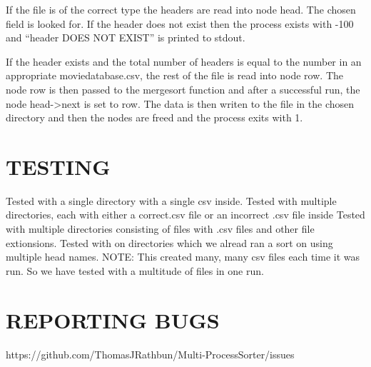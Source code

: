 \documentclass{article}
\begin{document}
\begin{center}
If the file is of the correct type the headers are read into node head. The chosen field is looked for. If the header does not exist then the process exists with -100 and ``header DOES NOT EXIST'' is printed to stdout.

If the header exists and the total number of headers is equal to the number in an appropriate moviedatabase.csv, the rest of the file is read into node row. The node row is then passed to the mergesort function and after a successful run, the node head->next is set to row. The data is then writen to the file in the chosen directory and then the nodes are freed and the process exits with 1.



\end{center}
\section{TESTING}
\begin{center}
Tested with a single directory with a single csv inside.
Tested with multiple directories, each with either a correct.csv file or an incorrect .csv file inside
Tested with multiple directories consisting of files with .csv files and other file extionsions.
Tested with on directories which we alread ran a sort on using multiple head names.
NOTE: This created many, many csv files each time it was run. So we have tested with a multitude of files in one run.
\end{center}
\section{REPORTING BUGS}
\begin{center}
https://github.com/ThomasJRathbun/Multi-ProcessSorter/issues
\end{center}
\end{document}
